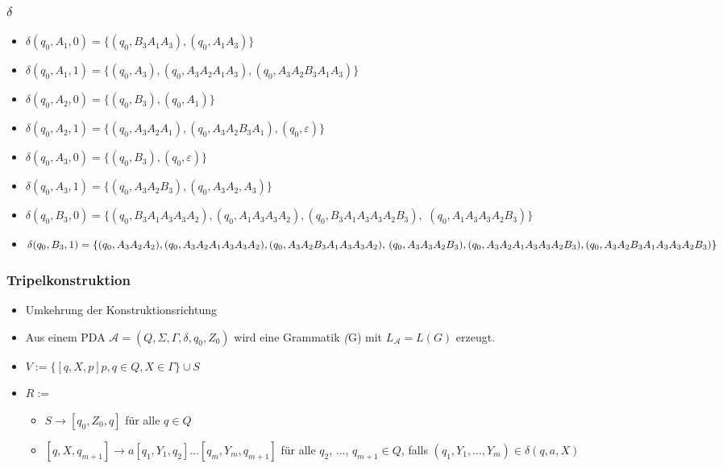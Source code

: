 \begin{frame}
 \frametitle{$\delta$}
\begin{itemize}
 \item \(\delta(q_0, A_1, 0) = \{ (q_0, B_3A_1A_3), (q_0, A_1A_3)\}\)
 \item \(\delta(q_0, A_1, 1) = \{(q_0, A_3), (q_0, A_3A_2A_1A_3), (q_0, A_3A_2B_3A_1A_3) \}\)
 \item \(\delta(q_0, A_2, 0) = \{(q_0, B_3), (q_0, A_1)\}\)
 \item \(\delta(q_0, A_2, 1) = \{(q_0, A_3A_2A_1), (q_0, A_3A_2B_3A_1), (q_0, \varepsilon)\}\)
 \item \(\delta(q_0, A_3, 0) = \{(q_0, B_3), (q_0, \varepsilon)\}\)
 \item \(\delta(q_0, A_3, 1) = \{(q_0, A_3A_2B_3), (q_0, A_3A_2, A_3)\}\)
 \item $\delta(q_0, B_3, 0) = \{(q_0, B_3A_1A_3A_3A_2), (q_0, A_1A_3A_3A_2), (q_0, B_3A_1A_3A_3A_2B_3),$ $ (q_0, A_1A_3A_3A_2B_3)\}$
 \item \(\delta(q_0, B_3, 1) = \{(q_0, A_3A_2A_2), (q_0, A_3A_2A_1A_3A_3A_2), (q_0, A_3A_2B_3A_1A_3A_3A_2),$ $
 (q_0, A_3A_3A_2B_3), (q_0, A_3A_2A_1A_3A_3A_2B_3), (q_0, A_3A_2B_3A_1A_3A_3A_2B_3)\}\)
\end{itemize}
\end{frame}

\begin{frame}
 \frametitle{Tripelkonstruktion}
 \begin{itemize}
  \item Umkehrung der Konstruktionsrichtung
  \item Aus einem PDA $\mathcal{A} = (Q, \Sigma, \Gamma, \delta, q_0, Z_0)$ wird eine Grammatik \textit(G) mit $L_{\mathcal{A}} = L(G)$ erzeugt.
 \end{itemize} 
 \begin{itemize}
  \item $V := \{[q, X, p]p, q \in Q, X \in \Gamma \} \cup S$
  \item $R := $
  \begin{itemize}
   \item $S \rightarrow [q_0, Z_0, q]$ für alle $q \in Q$
   \item $[q, X, q_{m+1}] \rightarrow a[q_1, Y_1, q_2] ... [q_m, Y_m, q_{m+1}]$ für alle $q_2$, ..., $q_{m+1} \in Q$,
   falls $(q_1, Y_1, ..., Y_m) \in \delta(q, a, X)$
  \end{itemize}
 \end{itemize}

\end{frame}

